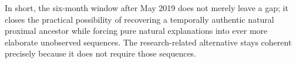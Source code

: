 In short, the six-month window after May 2019 does not merely leave a gap; it closes the practical possibility of recovering a temporally authentic natural proximal ancestor while forcing pure natural explanations into ever more elaborate unobserved sequences. The research-related alternative stays coherent precisely because it does not require those sequences.
